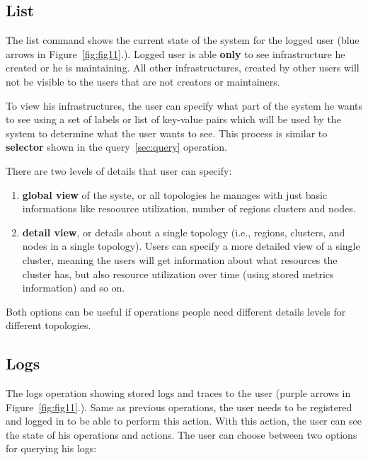 
%
%
\subsection{List}\label{sec:list} 
% 
The list command shows the current state of the system for the logged user (blue arrows in Figure~\ref{fig:fig11}.). Logged user is able \textbf{only} to see infrastructure he created or he is maintaining. All other infrastructures, created by other users will not be visible to the users that are not creators or maintainers.

To view his infrastructures, the user can specify what part of the system he wants to see using a set of labels or list of key-value pairs which will be used by the system to determine what the user wants to see. This process is similar to \textbf{selector} shown in the query~\ref{sec:query} operation. 

There are two levels of details that user can specify:

\begin{enumerate}[start=1,label={(\bfseries \arabic*)}]
	\item \textbf{global view}  of the syste, or all topologies he manages with just basic informations like resoource utilization, number of regions clusters and nodes.
	\item \textbf{detail view}, or details about a single topology (i.e., regions, clusters, and nodes in a single topology). Users can specify a more detailed view of a single cluster, meaning the users will get information about what resources the cluster has, but also resource utilization over time (using stored metrics information) and so on.
\end{enumerate}

\noindent
Both options can be useful if operations people need different details levels for different topologies. 
%
%
\subsection{Logs}\label{sec:logs}
% 
The logs operation showing stored logs and traces to the user (purple arrows in Figure~\ref{fig:fig11}.). Same as previous operations, the user needs to be registered and logged in to be able to perform this action. With this action, the user can see the state of his operations and actions. The user can choose between two options for querying his logs:

